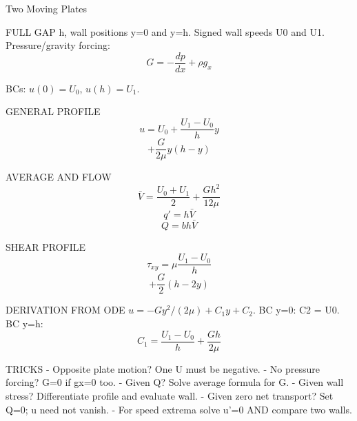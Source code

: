 Two Moving Plates

FULL GAP h, wall positions y=0 and y=h. Signed wall speeds U0 and U1. Pressure/gravity forcing:
$$G=-\frac{dp}{dx}+\rho g_x$$

BCs:
$u(0)=U_0$, $u(h)=U_1$.

GENERAL PROFILE
$$u=U_0+\frac{U_1-U_0}{h}y$$
$$+\frac{G}{2\mu}y(h-y)$$

AVERAGE AND FLOW
$$\bar V=\frac{U_0+U_1}{2}+\frac{Gh^2}{12\mu}$$
$$q'=h\bar V$$
$$Q=bh\bar V$$

SHEAR PROFILE
$$\tau_{xy}=\mu\frac{U_1-U_0}{h}$$
$$+\frac{G}{2}(h-2y)$$

DERIVATION FROM ODE
$u=-Gy^2/(2\mu)+C_1y+C_2$.
BC y=0: C2 = U0.
BC y=h:
$$C_1=\frac{U_1-U_0}{h}+\frac{Gh}{2\mu}$$

TRICKS
- Opposite plate motion? One U must be negative.
- No pressure forcing? G=0 if gx=0 too.
- Given Q? Solve average formula for G.
- Given wall stress? Differentiate profile and evaluate wall.
- Given zero net transport? Set Q=0; u need not vanish.
- For speed extrema solve u'=0 AND compare two walls.
